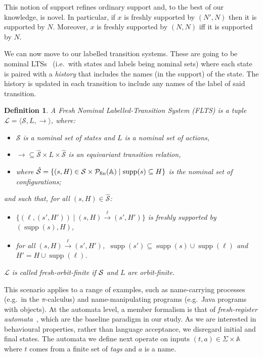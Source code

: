 \documentclass[10pt,a4paper]{article}
\newtheorem{definition}[theorem]{Definition}
\theoremstyle{definition}
\theoremstyle{remark}
\newcommand{\CONF}[1][\hat{\mathcal{S}}]{#1}
\DeclareMathOperator{\supp}{supp}
\newcommand\Pcal{\mathcal{P}}
\newcommand\Scal{\mathcal{S}}
\newcommand\PPfn{\Pcal_{\rm fin}}
\newcommand\Atoms{\mathbb{A}}
\renewcommand\S{N}
\begin{document}
This notion of support refines ordinary support and, to the best of our knowledge, is novel. In particular, if $x$ is freshly supported by $(\S',\S)$ then it is supported by $\S$. Moreover, $x$ is freshly supported by $(\S,\S)$ iff it is supported by $\S$.



We can now move to our labelled transition systems. These are going to be nominal LTSs~\cite{automatanominalsets} (i.e.\ with states and labels being nominal sets) where each state is paired with a \emph{history} that includes the names (in the support) of the state. The history is updated in each transition to include any names of the label of said transition. 

\begin{definition}
A \emph{Fresh Nominal Labelled-Transition System (FLTS)}
is a tuple $\mathcal{L}=\langle \mathcal{S},L,\rightarrow\rangle$, where:
\begin{itemize}
\item $\mathcal{S}$ is a nominal set of \emph{states}
and $L$ is a nominal set of \emph{actions},
\item    ${\rightarrow}\subseteq \CONF\times L\times\CONF$ is an equivariant \emph{transition relation},
  \item 
  where
 $\CONF=\{(s,H)\in\Scal\times\PPfn(\Atoms)\mid \supp(s)\subseteq H\}$ is the nominal set of \emph{configurations};
\end{itemize}
and such that, for all $(s,H) \in \CONF$:
 \begin{itemize}
     \item 
 $\{(\ell, (s', H'))\mid (s, H) \xrightarrow{\ell} (s', H')\}$ is freshly supported by $(\supp(s),H)$,
\item
for all $(s, H) \xrightarrow{\ell} (s', H')$,\
$\supp(s')\subseteq \supp(s)\cup \supp(\ell)$ and 
$H'=H\cup \supp(\ell)$.
 \end{itemize}
 $\mathcal{L}$ is called \emph{fresh-orbit-finite} if $\cal S$ and $L$ are orbit-finite.
\end{definition}

This scenario applies to a range of examples, such as name-carrying processes (e.g.\ in the $\pi$-calculus) and name-manipulating programs (e.g.\ Java programs with objects). At the automata level, a member formalism is that of \emph{fresh-register automata}~\cite{fra}, which are the baseline paradigm in our study. As we are interested in behavioural properties, rather than language acceptance, we disregard initial and final states. The automata we define next operate on inputs $(t,a)\in\Sigma\times\Atoms$ where $t$ comes from a finite set of \emph{tags} and $a$ is a name.  
\end{document}
